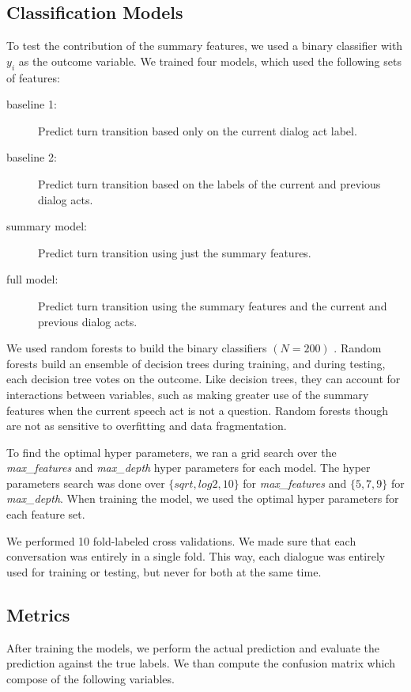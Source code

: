 \subsection{Classification Models}

    To test the contribution of the summary features, we used a binary classifier with
    $y_i$ as the outcome variable. We trained four models, which used the following sets of features:

    \begin{description}
        \item[baseline 1:] Predict turn transition based only on the current dialog act label.
        \item[baseline 2:] Predict turn transition based on the labels of the current and previous dialog acts.
        \item[summary model:] Predict turn transition using just the summary features.
        \item[full model:] Predict turn transition using the summary features and the current and previous dialog acts.
    \end{description}


We used random forests to build the binary classifiers $(N=200)$ \cite{Breiman01randomforests}. Random forests build an ensemble of decision trees during training, and during testing, each decision tree votes on the outcome.  Like decision trees, they can account for interactions between variables, such as making greater use of the summary features when the current speech act is not a question.  Random forests though are not as sensitive to overfitting and data fragmentation.

To find the optimal hyper parameters, we ran a grid search over the \textit{max\_features} and \textit{max\_depth} hyper parameters for each model. The hyper parameters search was done over $\{sqrt, log2, 10\}$ for \textit{max\_features} and $\{5, 7, 9\}$ for \textit{max\_depth}. When training the model, we used the optimal hyper parameters for each feature set.

We performed 10 fold-labeled cross validations.  We made sure that each conversation was entirely in a single fold. This way, each dialogue was entirely used for training or testing, but never for both at the same time.
   
\subsection{Metrics}
After training the models, we perform the actual prediction and evaluate the prediction against the true labels. We than compute the confusion matrix which compose of the following variables.



   
   
